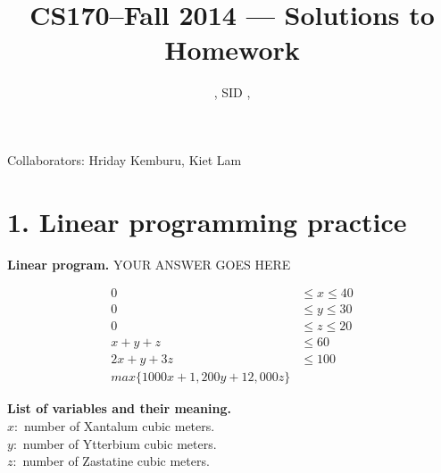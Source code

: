 \documentclass[11pt]{article}
\title{CS170--Fall 2014 --- Solutions to Homework \Homework}
\author{\Name, SID \SID, \texttt{\Login}}
\begin{document}
\maketitle

\noindent
Collaborators: Hriday Kemburu, Kiet Lam


\section*{1. Linear programming practice}
\noindent
\textbf{Linear program.}
YOUR ANSWER GOES HERE

 \begin{align*}
 0 &\le x \le 40\\
 0 &\le y \le 30\\
 0 &\le z \le 20\\
 x + y + z  &\le 60\\
 2x + y  + 3z &\le 100\\
 max\{ 1000x + 1,200y + 12,000z \}
 \end{align*}

\noindent
\textbf{List of variables and their meaning.}\\
$x:$ number of Xantalum cubic meters.\\
$y:$ number of Ytterbium cubic meters.\\
$z:$ number of Zastatine cubic meters.


\newpage
\end{document}
